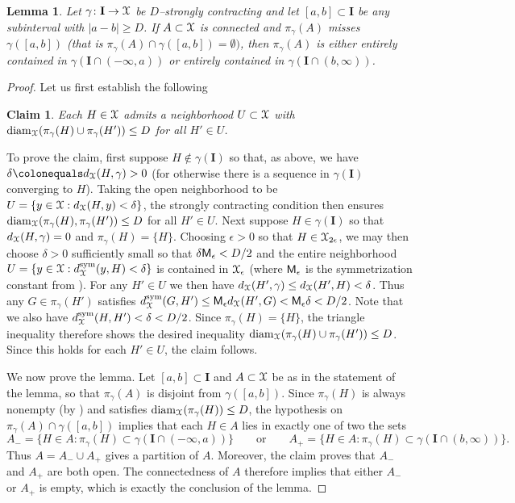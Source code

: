 \documentclass[letterpaper,fleqn]{article}
\theoremstyle{plain}
\newtheorem{lemma}[theorem]{Lemma}
\newtheorem*{claim}{Claim}
\theoremstyle{definition}
\DeclareMathOperator{\diam}{diam}
\newcommand{\abs}[1]{\left\vert#1\right\vert}
\newcommand{\os}{{\EuScript X}} %
\newcommand{\dsym}{d^{\mathrm{sym}}_\os} %
\newcommand{\cp}{\pi} %
\newcommand{\sym}{{\sf M}} %
\renewcommand{\diam}{\mathrm{diam}}
\newcommand{\I}{\mathbf{I}}
\begin{document}
\begin{lemma}\label{lem:dense_projection}
Let $\gamma\colon \I\to \os$ be $D$--strongly contracting and let $[a,b]\subset \I$ be any subinterval with $\abs{a-b} \ge D$. If $A\subset \os$ is connected and $\cp_\gamma(A)$ misses $\gamma([a,b])$ (that is $\cp_\gamma(A)\cap \gamma([a,b]) = \emptyset)$, then $\cp_\gamma(A)$ is either entirely contained in $\gamma(\I\cap (-\infty,a))$ or entirely contained in $\gamma(\I\cap(b,\infty))$.

\end{lemma}
\begin{proof}
Let us first establish the following
\begin{claim}
Each $H\in \os$ admits a neighborhood $U\subset \os$ with $\diam_\os(\cp_\gamma(H)\cup\cp_\gamma(H'))\le D$ for all $H'\in U$.
\end{claim}
To prove the claim, first suppose $H\notin\gamma(\I)$ so that, as above, we have $\delta\colonequals d_\os(H,\gamma) > 0$ (for otherwise there is a sequence in $\gamma(\I)$ converging to $H$). Taking the open neighborhood to be $U = \{y\in \os : d_\os(H,y)<\delta\}$, the strongly contracting condition then ensures $\diam_\os(\cp_\gamma(H),\cp_\gamma(H'))\le D$ for all $H'\in U$. Next suppose $H\in \gamma(\I)$ so that $d_\os(H,\gamma) = 0$ and $\cp_\gamma(H) = \{H\}$. Choosing $\epsilon>0$ so that $H\in \os_{2\epsilon}$, we may then choose $\delta > 0$ sufficiently small so that $\delta\sym_\epsilon < D/2$ and the entire neighborhood $U = \{y\in \os : \dsym(y,H)< \delta\}$ is contained in $\os_{\epsilon}$ (where $\sym_\epsilon$ is the symmetrization constant from ). For any $H'\in U$ we then have $d_\os(H',\gamma)\le d_\os(H',H)  < \delta$. Thus any $G\in \cp_\gamma(H')$ satisfies $\dsym(G,H')\le \sym_\epsilon d_\os(H',G) < \sym_\epsilon \delta < D/2$. Note that we also have $\dsym(H,H') < \delta < D/2$. Since $\cp_\gamma(H) = \{H\}$, the triangle inequality therefore shows the desired inequality $\diam_\os(\cp_\gamma(H)\cup\cp_\gamma(H'))\le D$. Since this holds for each $H'\in U$, the claim follows.

We now prove the lemma. Let $[a,b]\subset \I$ and $A\subset \os$ be as in the statement of the lemma, so that $\cp_\gamma(A)$ is disjoint from $\gamma([a,b])$. Since $\cp_\gamma(H)$ is always nonempty (by ) and satisfies $\diam_\os(\cp_\gamma(H))\le D$, 
the hypothesis on $\cp_\gamma(A)\cap \gamma([a,b])$ implies that each $H\in A$ lies in exactly one of two the sets
\[A_-=\{H\in A : \cp_\gamma(H)\subset \gamma(\I\cap(-\infty,a))\}\qquad\text{or}\qquad A_+=\{H\in A : \cp_\gamma(H)\subset \gamma(\I\cap(b,\infty))\}.\]
Thus $A = A_-\cup A_+$ gives a partition of $A$. Moreover, the claim proves that $A_-$ and $A_+$ are both open. The connectedness of $A$ therefore implies that either $A_-$ or $A_+$ is empty, which is exactly the conclusion of the lemma.
\end{proof}
\end{document}
